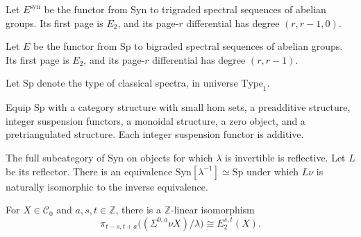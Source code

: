 \begin{definition}
\label{frontier:AdamsSynthetic:46d2c66c5a63}
Let $E^{\mathrm{syn}}$ be the functor from $\mathrm{Syn}$ to trigraded spectral sequences of abelian groups. Its first page is $E_2$, and its page-$r$ differential has degree $(r,r-1,0)$.
\end{definition}

\begin{definition}
\label{frontier:AdamsSynthetic:48bf5d838430}
Let $E$ be the functor from $\mathrm{Sp}$ to bigraded spectral sequences of abelian groups. Its first page is $E_2$, and its page-$r$ differential has degree $(r,r-1)$.
\end{definition}

\begin{definition}
\label{frontier:AdamsSynthetic:5833df0c640f}
Let $\mathrm{Sp}$ denote the type of classical spectra, in universe $\mathrm{Type}_1$.
\end{definition}

\begin{definition}
\label{frontier:AdamsSynthetic:6793885d9e9c}
Equip $\mathrm{Sp}$ with a category structure with small hom sets, a preadditive structure, integer suspension functors, a monoidal structure, a zero object, and a pretriangulated structure. Each integer suspension functor is additive.
\end{definition}

\begin{definition}
\label{frontier:AdamsSynthetic:68731f808d69}
The full subcategory of $\mathrm{Syn}$ on objects for which $\lambda$ is invertible is reflective. Let $L$ be its reflector. There is an equivalence $\mathrm{Syn}[\lambda^{-1}]\simeq\mathrm{Sp}$ under which $L\nu$ is naturally isomorphic to the inverse equivalence.
\end{definition}

\begin{definition}
\label{frontier:AdamsSynthetic:740de17a7d73}
For $X\in\mathcal C_0$ and $a,s,t\in\mathbb Z$, there is a $\mathbb Z$-linear isomorphism
\[
\pi_{t-s,t+a}\bigl((\Sigma^{0,a}\nu X)/\lambda\bigr)\cong E_2^{s,t}(X).
\]
\end{definition}



